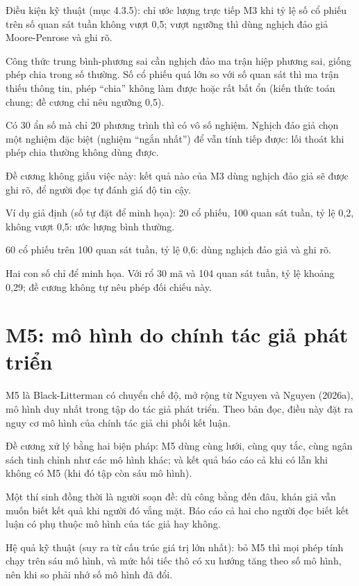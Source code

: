 Điều kiện kỹ thuật (mục 4.3.5): chỉ ước lượng trực tiếp M3 khi tỷ lệ số cổ phiếu trên số quan sát tuần không vượt 0,5; vượt ngưỡng thì dùng nghịch đảo giả Moore-Penrose và ghi rõ.

Công thức trung bình-phương sai cần nghịch đảo ma trận hiệp phương sai, giống phép chia trong số thường. Số cổ phiếu quá lớn so với số quan sát thì ma trận thiếu thông tin, phép “chia” không làm được hoặc rất bất ổn (kiến thức toán chung; đề cương chỉ nêu ngưỡng 0,5).

Có 30 ẩn số mà chỉ 20 phương trình thì có vô số nghiệm. Nghịch đảo giả chọn một nghiệm đặc biệt (nghiệm “ngắn nhất”) để vẫn tính tiếp được: lối thoát khi phép chia thường không dùng được.

Đề cương không giấu việc này: kết quả nào của M3 dùng nghịch đảo giả sẽ được ghi rõ, để người đọc tự đánh giá độ tin cậy.

\begin{tcolorbox}[breakable]
Ví dụ giả định (số tự đặt để minh họa): 20 cổ phiếu, 100 quan sát tuần, tỷ lệ 0,2, không vượt 0,5: ước lượng bình thường.

60 cổ phiếu trên 100 quan sát tuần, tỷ lệ 0,6: dùng nghịch đảo giả và ghi rõ.

Hai con số chỉ để minh họa. Với rổ 30 mã và 104 quan sát tuần, tỷ lệ khoảng 0,29; đề cương không tự nêu phép đối chiếu này.
\end{tcolorbox}

\section{M5: mô hình do chính tác giả phát triển}

M5 là Black-Litterman có chuyển chế độ, mở rộng từ Nguyen và Nguyen (2026a), mô hình duy nhất trong tập do tác giả phát triển. Theo bản đọc, điều này đặt ra nguy cơ mô hình của chính tác giả chi phối kết luận.

Đề cương xử lý bằng hai biện pháp: M5 dùng cùng lưới, cùng quy tắc, cùng ngân sách tinh chỉnh như các mô hình khác; và kết quả báo cáo cả khi có lẫn khi không có M5 (khi đó tập còn sáu mô hình).

Một thí sinh đồng thời là người soạn đề: dù công bằng đến đâu, khán giả vẫn muốn biết kết quả khi người đó vắng mặt. Báo cáo cả hai cho người đọc biết kết luận có phụ thuộc mô hình của tác giả hay không.

Hệ quả kỹ thuật (suy ra từ cấu trúc giá trị lớn nhất): bỏ M5 thì mọi phép tính chạy trên sáu mô hình, và mức hối tiếc thô có xu hướng tăng theo số mô hình, nên khi so phải nhớ số mô hình đã đổi.

